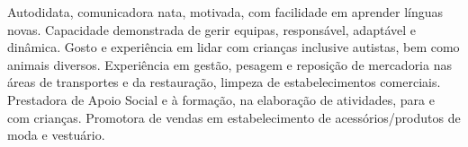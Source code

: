 

\begin{cvsummary}
\vspace{0.5cm}
Autodidata, comunicadora nata, motivada, com facilidade em aprender línguas novas.
Capacidade demonstrada de gerir equipas, responsável, adaptável e dinâmica.
Gosto e experiência em lidar com crianças inclusive autistas, bem como animais diversos.
Experiência em gestão, pesagem e reposição de mercadoria nas áreas de transportes e da restauração, limpeza de estabelecimentos comerciais. Prestadora de Apoio Social e à formação, na elaboração de atividades, para e com crianças. Promotora de vendas em estabelecimento de acessórios/produtos de moda e vestuário.
\end{cvsummary}
